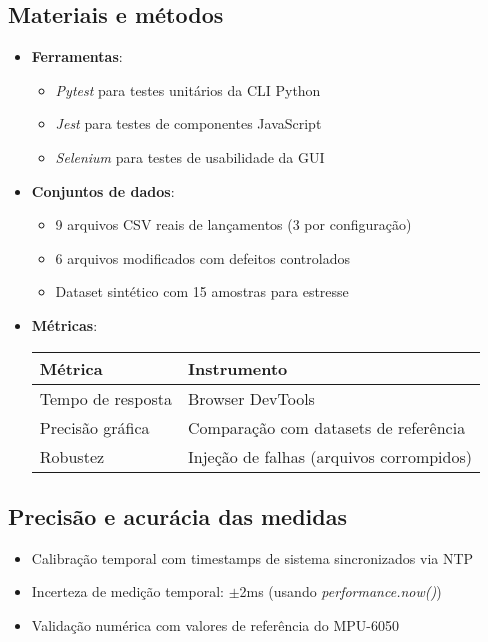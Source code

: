 \subsection{Materiais e métodos}
\begin{itemize}
    \item \textbf{Ferramentas}: 
    \begin{itemize}
        \item \textit{Pytest} para testes unitários da CLI Python
        \item \textit{Jest} para testes de componentes JavaScript
        \item \textit{Selenium} para testes de usabilidade da GUI
    \end{itemize}
    
    \item \textbf{Conjuntos de dados}:
    \begin{itemize}
        \item 9 arquivos CSV reais de lançamentos (3 por configuração)
        \item 6 arquivos modificados com defeitos controlados
        \item Dataset sintético com 15 amostras para estresse
    \end{itemize}
    
    \item \textbf{Métricas}:
    \begin{table}[H]
        \centering
        \begin{tabular}{|l|l|}
            \hline
            Métrica & Instrumento \\
            \hline
            Tempo de resposta & Browser DevTools \\
            Precisão gráfica & Comparação com datasets de referência \\
            Robustez & Injeção de falhas (arquivos corrompidos) \\
            \hline
        \end{tabular}
    \end{table}
\end{itemize}

\subsection{Precisão e acurácia das medidas}
\begin{itemize}
    \item Calibração temporal com timestamps de sistema sincronizados via NTP
    \item Incerteza de medição temporal: $\pm$2ms (usando \textit{performance.now()})
    \item Validação numérica com valores de referência do MPU-6050
\end{itemize}

